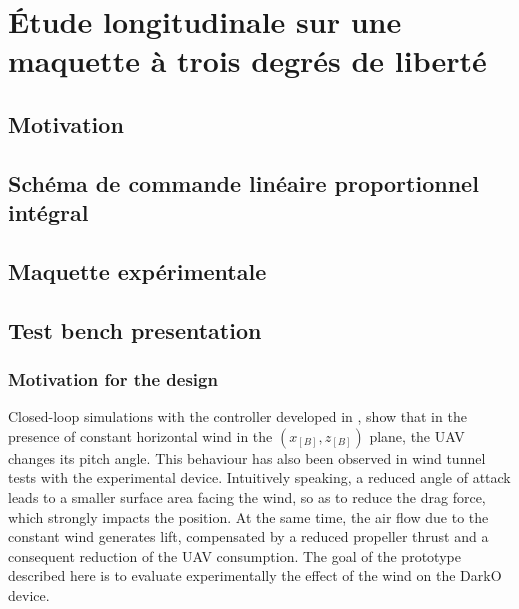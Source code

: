 \chapter{Étude longitudinale sur une maquette à trois degrés de liberté}
\minitoc

\section{Motivation}

\section{Schéma de commande linéaire proportionnel intégral}

\section{Maquette expérimentale}

\section{Test bench presentation}\label{sec:test_bench}
\subsection{Motivation for the design}\label{subsec:motivation}
Closed-loop simulations with the controller developed in \cite[]{sansouECC}, show that in the presence of constant horizontal wind in the $(x_{[B]},z_{[B]})$ plane, the UAV changes its pitch angle. This behaviour has also been observed in wind tunnel tests with the experimental device. Intuitively speaking, a reduced angle of attack leads to a smaller surface area facing the wind, so as to reduce the drag force, which strongly impacts the position. At the same time, the air flow due to the constant wind generates lift, compensated by a reduced propeller thrust and a consequent reduction of the UAV consumption. The goal of the prototype described here is to evaluate experimentally the effect of the wind on the DarkO device.


